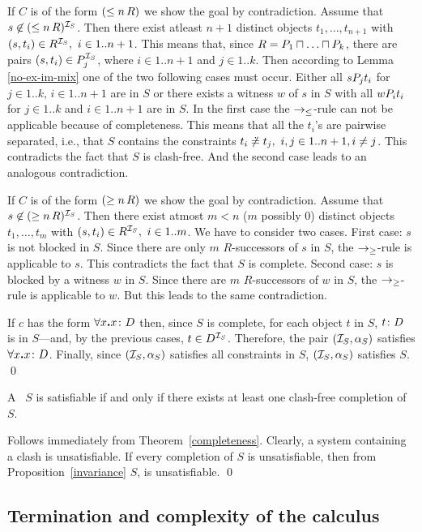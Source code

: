 If $C$ is of the form $(\leq n \, R)$ we show the goal by contradiction.
Assume that $s \not\in (\leq n \, R)^{{\cal I}_S}$.
Then there exist atleast $n+1$ distinct objects $t_1,\ldots,t_{n+1}$
with $(s,t_i) \in R^{{\cal I}_S},\ i \in 1..n+1$.
This means that, since $R= P_1\sqcap\ldots\sqcap P_k$, there are pairs 
$(s,t_i) \in P_j^{{\cal I}_S}$, where $i \in 1..n+1$ and $j \in 1..k$.
Then according to Lemma \ref{no-ex-im-mix} one of the two following cases
must occur. Either all $sP_j t_i$ for $j \in 1..k,\,i \in 1..n+1$
are in $S$ or there exists a witness $w$ of $s$ in $S$ with all
$wP_i t_i$ for $j \in 1..k$ and $i \in 1..n+1$ are in $S$.
In the first case the $\rightarrow_\leq$-rule can not be applicable
because of completeness.
This means that all the $t_i$'s are pairwise separated, i.e., that $S$
contains the constraints ${t_i \not\doteq t_j},~ i,j \in 1..n+1,i \neq j$.
This contradicts the fact that $S$ is clash-free.
And the second case leads to an analogous contradiction.

If $C$ is of the form $(\geq n \, R)$ we show the goal by contradiction.
Assume that $s \not\in (\geq n \, R)^{{\cal I}_S}$.
Then there exist atmost $m<n$ ($m$ possibly 0) distinct objects
$t_1,\ldots,t_m$ with $(s,t_i) \in R^{{\cal I}_S},\ i \in 1..m$.
We have to consider two cases.
First case: $s$ is not blocked in $S$.
Since there are only $m$ $R$-successors of $s$ in $S$,
the $\rightarrow_\geq$-rule is applicable to $s$.
This contradicts the fact that $S$ is complete.
Second case: $s$ is blocked by a witness $w$ in $S$.
Since there are $m$ $R$-successors of $w$ in $S$,
the $\rightarrow_\geq$-rule is applicable to $w$.
But this leads to the same contradiction.

If $c$ has the form $\forall x\mbox{\bf .}{x\colon D}$ then, since $S$ is complete, for
each object $t$ in $S$, $t\colon D$ is in $S$---and, by the previous cases,
$t \in D^{{\cal I}_S}$.
Therefore, the pair $({{\cal I}_S},{\alpha_S})$ satisfies $\forall x\mbox{\bf .}{x\colon D}$.
Finally, since $({{\cal I}_S},{\alpha_S})$ satisfies all constraints in $S$,
$({{\cal I}_S},{\alpha_S})$ satisfies $S$.
\qed

\begin{theorem}[Correctness]\label{correctness}
A \cs\ $S$ is satisfiable if and only if there exists at least one
clash-free completion of $S$.
\end{theorem}
%
\proof
\If
Follows immediately from  Theorem~\ref{completeness}.
\Onlyif
Clearly, a system containing a clash is unsatisfiable. If every completion of
$S$ is unsatisfiable, then from Proposition~\ref{invariance} $S$, is
unsatisfiable.
\qed

\subsection{Termination and complexity of the calculus}


